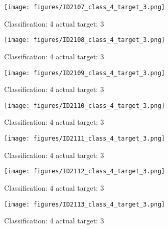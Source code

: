 \begin{figure}[h!]
\begin{center}
\texttt{[image: figures/ID2107\_class\_4\_target\_3.png]}
\end{center}
\caption{ Classification: 4 actual target: 3}
\label{fig:ID2107_class_4_target_3}
\end{figure}
\begin{figure}[h!]
\begin{center}
\texttt{[image: figures/ID2108\_class\_4\_target\_3.png]}
\end{center}
\caption{ Classification: 4 actual target: 3}
\label{fig:ID2108_class_4_target_3}
\end{figure}
\begin{figure}[h!]
\begin{center}
\texttt{[image: figures/ID2109\_class\_4\_target\_3.png]}
\end{center}
\caption{ Classification: 4 actual target: 3}
\label{fig:ID2109_class_4_target_3}
\end{figure}
\begin{figure}[h!]
\begin{center}
\texttt{[image: figures/ID2110\_class\_4\_target\_3.png]}
\end{center}
\caption{ Classification: 4 actual target: 3}
\label{fig:ID2110_class_4_target_3}
\end{figure}
\begin{figure}[h!]
\begin{center}
\texttt{[image: figures/ID2111\_class\_4\_target\_3.png]}
\end{center}
\caption{ Classification: 4 actual target: 3}
\label{fig:ID2111_class_4_target_3}
\end{figure}
\begin{figure}[h!]
\begin{center}
\texttt{[image: figures/ID2112\_class\_4\_target\_3.png]}
\end{center}
\caption{ Classification: 4 actual target: 3}
\label{fig:ID2112_class_4_target_3}
\end{figure}
\begin{figure}[h!]
\begin{center}
\texttt{[image: figures/ID2113\_class\_4\_target\_3.png]}
\end{center}
\caption{ Classification: 4 actual target: 3}
\label{fig:ID2113_class_4_target_3}
\end{figure}
